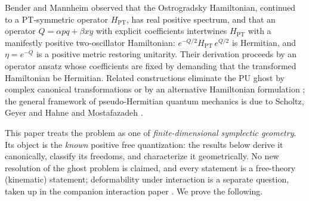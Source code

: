 \documentclass[11pt]{article}
\theoremstyle{definition}
\theoremstyle{remark}
\begin{document}
Bender and Mannheim \cite{BM2008PRL,BM2008PRD} observed that the Ostrogradsky
Hamiltonian, continued to a PT-symmetric operator $H_{\mathrm{PT}}$, has real
positive spectrum, and that an operator $Q=\alpha pq+\beta xy$ with explicit
coefficients intertwines $H_{\mathrm{PT}}$ with a manifestly positive
two-oscillator Hamiltonian: $e^{-Q/2}H_{\mathrm{PT}}\,e^{Q/2}$ is Hermitian,
and $\eta=e^{-Q}$ is a positive metric restoring unitarity.  Their derivation
proceeds by an operator ansatz whose coefficients are fixed by demanding that
the transformed Hamiltonian be Hermitian.  Related constructions eliminate
the PU ghost by complex canonical transformations \cite{Dector2009} or by an
alternative Hamiltonian formulation \cite{Mostafazadeh2010PU}; the general
framework of pseudo-Hermitian quantum mechanics is due to Scholtz, Geyer and
Hahne \cite{SGH1992} and Mostafazadeh \cite{Mostafazadeh2002,Mostafazadeh2010}.

This paper treats the problem as one of \emph{finite-dimensional symplectic
geometry}.  Its object is the \emph{known} positive free quantization: the
results below derive it canonically, classify its freedoms, and
characterize it geometrically.  No new resolution of the ghost problem is
claimed, and every statement is a free-theory (kinematic) statement;
deformability under interaction is a separate question, taken up in the
companion interaction paper \cite{companionV}.  We prove the following.
\end{document}
